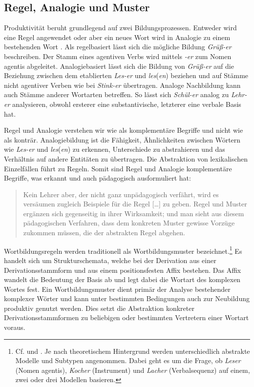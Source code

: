 \subsection{Regel, Analogie und Muster}\label{subsection:RegelAnalogieMuster}

Produktivität beruht grundlegend auf zwei Bildungsprozessen. Entweder wird eine Regel angewendet oder aber ein neues Wort wird in Analogie zu einem bestehenden Wort . Als regelbasiert lässt sich die mögliche Bildung \textit{Grüß-er} beschreiben. Der Stamm eines agentiven Verbs wird mittels \textit{-er} zum Nomen agentis abgeleitet. Analogiebasiert lässt sich die Bildung von \textit{Grüß-er} auf die Beziehung zwischen dem etablierten \textit{Les-er} und \textit{les}(\textit{en}) beziehen und auf Stämme nicht agentiver Verben wie bei \textit{Stink-er} übertragen. Analoge Nachbildung kann auch Stämme anderer Wortarten betreffen. So lässt sich \textit{Schül-er} analog zu \textit{Lehr-er} analysieren, obwohl ersterer eine substantivische, letzterer eine verbale Basis hat.

Regel und Analogie verstehen wir wie \citet[23--25]{Motsch2004} als komplementäre Begriffe und nicht wie \citet[67]{FleischerBarz2012} als konträr. Analogiebildung ist die Fähigkeit, Ähnlichkeiten zwischen Wörtern wie \textit{Les-er} und \textit{les}(\textit{en}) zu erkennen, Unterschiede zu abstrahieren und das Verhältnis auf andere Entitäten zu übertragen. Die Abstraktion von lexikalischen Einzelfällen führt zu Regeln. Somit sind Regel und Analogie komplementäre Begriffe, was \citet[110]{Paul1880} erkannt und auch pädagogisch ausformuliert hat:

\begin{quote}
Kein Lehrer aber, der nicht ganz unpädagogisch verfährt, wird es versäumen zugleich Beispiele für die Regel [\ldots{}] zu geben. Regel und Muster ergänzen sich gegenseitig in ihrer Wirksamkeit; und man sieht aus diesem pädagogischen Verfahren, dass dem konkreten Muster gewisse Vorzüge zukommen müssen, die der abstrakten Regel abgehen.
\end{quote}

Wortbildungsregeln werden traditionell als Wortbildungsmuster bezeichnet.\footnote{Cf. \citet[67--68]{FleischerBarz2012} und \citet[15]{Motsch2004}. Je nach theoretischem Hintergrund werden unterschiedlich abstrakte Modelle und Subtypen angenommen. Dabei geht es \zB um die Frage, ob \textit{Leser} (Nomen agentis), \textit{Kocher} (Instrument) und \textit{Lacher} (Verbalsequenz) auf einem, zwei oder drei Modellen basieren.} Es handelt sich um Strukturschemata, welche bei der Derivation aus einer Derivationsstammform und aus einem positionsfesten Affix bestehen. Das Affix wandelt die Bedeutung der Basis ab und legt dabei die Wortart des komplexen Wortes fest. Ein Wortbildungsmuster dient primär der Analyse bestehender komplexer Wörter und kann unter bestimmten Bedingungen auch zur Neubildung produktiv genutzt werden. Dies setzt die Abstraktion konkreter Derivationsstammformen zu beliebigen oder bestimmten Vertretern einer Wortart voraus.

